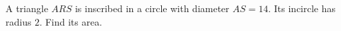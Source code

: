 A triangle $ARS$ is inscribed in a circle with diameter $AS=14$. Its incircle has radius $2$. Find its area.
